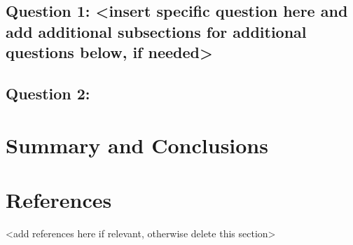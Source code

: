 \documentclass[
]{article}
\begin{document}
\hypertarget{question-1-insert-specific-question-here-and-add-additional-subsections-for-additional-questions-below-if-needed}{%
\subsection{Question 1: \textless insert specific question here and add
additional subsections for additional questions below, if
needed\textgreater{}}\label{question-1-insert-specific-question-here-and-add-additional-subsections-for-additional-questions-below-if-needed}}

\hypertarget{question-2}{%
\subsection{Question 2:}\label{question-2}}

\newpage

\hypertarget{summary-and-conclusions}{%
\section{Summary and Conclusions}\label{summary-and-conclusions}}

\newpage

\hypertarget{references}{%
\section{References}\label{references}}

\textless add references here if relevant, otherwise delete this
section\textgreater{}
\end{document}
